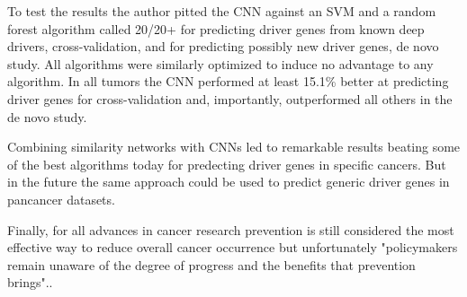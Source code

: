 \documentclass{article}
\begin{document}

To test the results the author pitted the CNN against an SVM and a random forest algorithm called 20/20+ for predicting driver genes from known deep drivers, cross-validation, and for predicting possibly new driver genes, de novo study. All algorithms were similarly optimized to induce no advantage to any algorithm. In all tumors the CNN performed at least 15.1\% better at predicting driver genes for cross-validation and, importantly, outperformed all others in the de novo study. 

Combining similarity networks with CNNs led to remarkable results beating some of the best algorithms today for predecting driver genes in specific cancers. But in the future the same approach could be used to predict generic driver genes in pancancer datasets. 

Finally, for all advances in cancer research prevention is still considered the most effective way to reduce overall cancer occurrence but unfortunately "policymakers remain unaware of the degree of progress and the benefits that prevention brings".\cite{bray2018globalCancerStats}.




\end{document}

